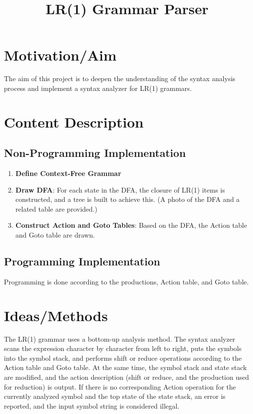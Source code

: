 \documentclass[a4paper,12pt]{article}
\title{LR(1) Grammar Parser}\date{}
\begin{document}
 
\tableofcontents
\newpage
\maketitle

\section{Motivation/Aim}
The aim of this project is to deepen the understanding of the syntax analysis process and implement a syntax analyzer for LR(1) grammars.

\section{Content Description}
\subsection{Non-Programming Implementation}
\begin{enumerate}
    \item \textbf{Define Context-Free Grammar}
    \item \textbf{Draw DFA}: For each state in the DFA, the closure of LR(1) items is constructed, and a tree is built to achieve this. (A photo of the DFA and a related table are provided.)
    \item \textbf{Construct Action and Goto Tables}: Based on the DFA, the Action table and Goto table are drawn.
\end{enumerate}

\subsection{Programming Implementation}
Programming is done according to the productions, Action table, and Goto table.

\section{Ideas/Methods}
The LR(1) grammar uses a bottom-up analysis method. The syntax analyzer scans the expression character by character from left to right, puts the symbols into the symbol stack, and performs shift or reduce operations according to the Action table and Goto table. At the same time, the symbol stack and state stack are modified, and the action description (shift or reduce, and the production used for reduction) is output. If there is no corresponding Action operation for the currently analyzed symbol and the top state of the state stack, an error is reported, and the input symbol string is considered illegal.
\end{document}
